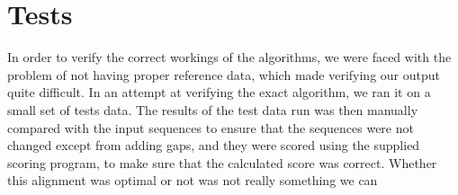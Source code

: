 \section{Tests}
In order to verify the correct workings of the algorithms, we were faced with the problem of not having proper reference data, which made verifying our output quite difficult.
In an attempt at verifying the exact algorithm, we ran it on a small set of tests data. The results of the test data run was then manually compared with the input sequences to ensure that the sequences were not changed except from adding gaps, and they were scored using the supplied scoring program, to make sure that the calculated score was correct. Whether this alignment was optimal or not was not really something we can 